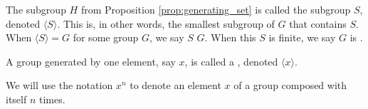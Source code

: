 \begin{defn}
The subgroup $ H $ from Proposition \ref{prop:generating_set} is called the subgroup  $ S $, denoted $ \langle S\rangle $. This is, in other words, the smallest subgroup of $ G $ that contains $ S $. When $ \langle S\rangle=G $ for some group $ G $, we say $ S $  $ G $. When this $ S $ is finite, we say $ G $ is .
\end{defn}

\begin{defn}
A group generated by one element, say $ x $, is called a , denoted $ \langle x\rangle $.
\end{defn}

We will use the notation $ x^n $ to denote an element $ x $ of a group composed with itself $ n $ times.

